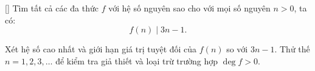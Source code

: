 \documentclass[../07-integer-polynomials.tex]{subfiles}
\begin{document}
\begin{exercise*}\label{example:FRA-2015-TST3-P1}[\textbf{}]
    Tìm tất cả các đa thức \( f \) với hệ số nguyên sao cho với mọi số nguyên \( n > 0 \), ta có:
    \[
        f(n) \mid 3n - 1.
    \]
\end{exercise*}

\begin{remark*}
    Xét hệ số cao nhất và giới hạn giá trị tuyệt đối của \( f(n) \) so với \( 3n - 1 \).
    Thử thế \( n = 1, 2, 3, \dots \) để kiểm tra giả thiết và loại trừ trường hợp \( \deg f > 0 \).
\end{remark*}



\end{document}
